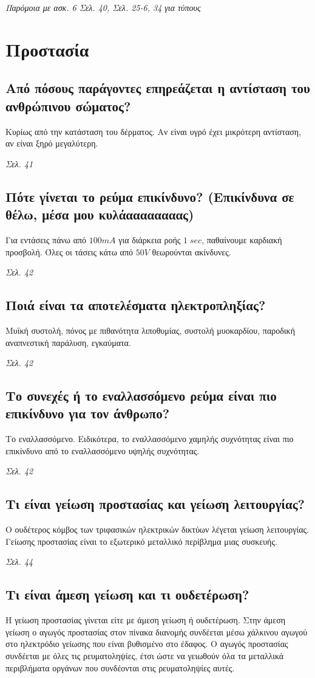 \documentclass{article}
\begin{document}
\emph{Παρόμοια με ασκ. 6 Σελ. 40, Σελ. 25-6, 34 για τύπους}

\section{Προστασία}
\subsection{Από πόσους παράγοντες επηρεάζεται η αντίσταση του ανθρώπινου σώματος?}
Κυρίως από την κατάσταση του δέρματος. Αν είναι υγρό έχει μικρότερη αντίσταση, αν είναι ξηρό μεγαλύτερη.

\emph{Σελ. 41}

\subsection{Πότε γίνεται το ρεύμα επικίνδυνο? (Επικίνδυνα σε θέλω, μέσα μου κυλάαααααααας)}
Για εντάσεις πάνω από $100mA$ για διάρκεια ροής $1\;sec$, παθαίνουμε καρδιακή προσβολή. Όλες οι τάσεις κάτω από $50V$ θεωρούνται ακίνδυνες.

\emph{Σελ. 42}

\subsection{Ποιά είναι τα αποτελέσματα ηλεκτροπληξίας?}
Μυϊκή συστολή, πόνος με πιθανότητα λιποθυμίας, συστολή μυοκαρδίου, παροδική αναπνεστική παράλυση, εγκαύματα.

\emph{Σελ. 42}

\subsection{Το συνεχές ή το εναλλασσόμενο ρεύμα είναι πιο επικίνδυνο για τον άνθρωπο?}
Το εναλλασσόμενο. Ειδικότερα, το εναλλασσόμενο χαμηλής συχνότητας είναι πιο επικίνδυνο από το εναλλασσόμενο υψηλής συχνότητας.

\emph{Σελ. 42}

\subsection{Τι είναι γείωση προστασίας και γείωση λειτουργίας?}
Ο ουδέτερος κόμβος των τριφασικών ηλεκτρικών δικτύων λέγεται γείωση λειτουργίας. Γείωσης προστασίας είναι το εξωτερικό μεταλλικό περίβλημα μιας συσκευής.

\emph{Σελ.  44}

\subsection{Τι είναι άμεση γείωση και τι ουδετέρωση?}
Η γείωση προστασίας γίνεται είτε με άμεση γείωση ή ουδετέρωση. Στην άμεση γείωση ο αγωγός προστασίας στον πίνακα διανομής συνδέεται μέσω χάλκινου αγωγού στο ηλεκτρόδιο
γείωσης που είναι βυθισμένο στο έδαφος. Ο αγωγός προστασίας συνδέεται με όλες τις ρευματοληψίες, έτσι ώστε να γειωθούν όλα τα μεταλλικά περιβλήματα οργάνων που συνδέονται
στις ρευματοληψίες αυτές.
\end{document}
